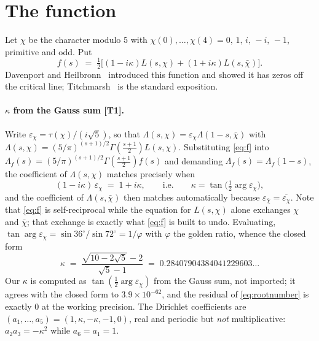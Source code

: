 \documentclass[11pt,a4paper]{article}
\theoremstyle{definition}
\theoremstyle{remark}
\newcommand{\tier}[1]{{\small\textsf{[#1]}}}
\begin{document}
\section{The function}\label{sec:fn}

Let $\chi$ be the character modulo $5$ with
$\chi(0),\ldots,\chi(4) = 0,\,1,\,i,\,-i,\,-1$, primitive and odd. Put
\begin{equation}\label{eq:f}
f(s) \;=\; \tfrac12\bigl[(1-i\kappa)L(s,\chi) + (1+i\kappa)L(s,\bar\chi)\bigr].
\end{equation}
Davenport and Heilbronn~\cite{DH36} introduced this function and showed it has zeros off
the critical line; Titchmarsh~\cite[\S10.25]{Titchmarsh} is the standard exposition.

\paragraph{$\kappa$ from the Gauss sum \tier{T1}.} Write
$\varepsilon_\chi = \tau(\chi)/(i\sqrt5)$, so that
$\Lambda(s,\chi) = \varepsilon_\chi\Lambda(1-s,\bar\chi)$ with
$\Lambda(s,\chi) = (5/\pi)^{(s+1)/2}\Gamma(\tfrac{s+1}{2})L(s,\chi)$. Substituting
\eqref{eq:f} into $\Lambda_f(s) = (5/\pi)^{(s+1)/2}\Gamma(\tfrac{s+1}{2})f(s)$ and
demanding $\Lambda_f(s) = \Lambda_f(1-s)$, the coefficient of $\Lambda(s,\chi)$ matches
precisely when
\begin{equation}\label{eq:rootnumber}
(1-i\kappa)\,\varepsilon_\chi \;=\; 1+i\kappa,
\qquad\text{i.e.}\qquad \kappa = \tan\bigl(\tfrac12\arg\varepsilon_\chi\bigr),
\end{equation}
and the coefficient of $\Lambda(s,\bar\chi)$ then matches automatically because
$\varepsilon_{\bar\chi} = \overline{\varepsilon_\chi}$. Note that \eqref{eq:f} is
self-reciprocal while the equation for $L(s,\chi)$ alone exchanges $\chi$ and $\bar\chi$;
that exchange is exactly what \eqref{eq:f} is built to undo. Evaluating,
$\tan\arg\varepsilon_\chi = \sin 36^\circ/\sin 72^\circ = 1/\varphi$ with $\varphi$ the
golden ratio, whence the closed form
\[
\kappa \;=\; \frac{\sqrt{10-2\sqrt5}-2}{\sqrt5-1}
\;=\; 0.28407904384041229603\ldots
\]
Our $\kappa$ is computed as $\tan(\tfrac12\arg\varepsilon_\chi)$ from the Gauss sum, not
imported; it agrees with the closed form to $3.9\times10^{-62}$, and the residual of
\eqref{eq:rootnumber} is exactly $0$ at the working precision. The Dirichlet coefficients
are $(a_1,\ldots,a_5) = (1,\kappa,-\kappa,-1,0)$, real and periodic but \emph{not}
multiplicative: $a_2a_3 = -\kappa^2$ while $a_6 = a_1 = 1$.
\end{document}
